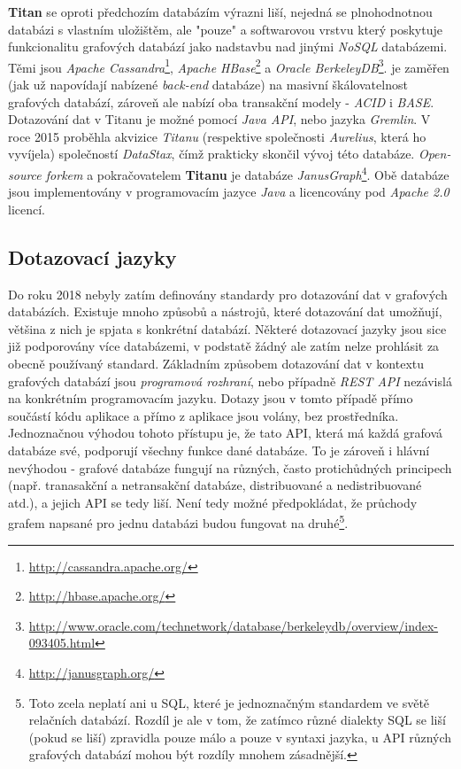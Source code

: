\textbf{Titan} se oproti předchozím databázím výrazni liší, nejedná se plnohodnotnou databázi s vlastním uložištěm, ale "pouze" a softwarovou vrstvu který poskytuje funkcionalitu grafových databází jako nadstavbu nad jinými \textit{NoSQL} databázemi. Těmi jsou \textit{Apache Cassandra}\footnote{\url{http://cassandra.apache.org/}}, \textit{Apache HBase}\footnote{\url{http://hbase.apache.org/}} a \textit{Oracle BerkeleyDB}\footnote{\url{http://www.oracle.com/technetwork/database/berkeleydb/overview/index-093405.html}}.  je zaměřen (jak už napovídají nabízené \textit{back-end} databáze) na masivní škálovatelnost grafových databází, zároveň ale nabízí oba transakční modely - \textit{ACID} i \textit{BASE}. Dotazování dat v Titanu je možné pomocí \textit{Java API}, nebo jazyka \textit{Gremlin}. V roce 2015 proběhla akvizice \textit{Titanu} (respektive společnosti \textit{Aurelius}, která ho vyvíjela) společností \textit{DataStax}, čímž prakticky skončil vývoj této databáze. \textit{Open-source forkem} a pokračovatelem\cite{Datami17} \textbf{Titanu} je databáze \textit{JanusGraph}\footnote{\url{http://janusgraph.org/}}. Obě databáze jsou implementovány v programovacím jazyce \textit{Java} a licencovány pod \textit{Apache 2.0} licencí. 


\subsection{Dotazovací jazyky}
\label{sec:gdb-jazyky}

Do roku 2018 nebyly zatím definovány standardy pro dotazování dat v grafových databázích. Existuje mnoho způsobů a nástrojů, které dotazování dat umožňují, většina z nich je spjata s konkrétní databází. Některé dotazovací jazyky jsou sice již podporovány více databázemi, v podstatě žádný ale zatím nelze prohlásit za obecně používaný standard. Základním způsobem dotazování dat v kontextu grafových databází jsou \textit{programová rozhraní}, nebo případně \textit{REST API} nezávislá na konkrétním programovacím jazyku. Dotazy jsou v tomto případě přímo součástí kódu aplikace a přímo z aplikace jsou volány, bez prostředníka. Jednoznačnou výhodou tohoto přístupu je, že tato API, která má každá grafová databáze své, podporují všechny funkce dané databáze. To je zároveň i hlávní nevýhodou - grafové databáze fungují na různých, často protichůdných principech (např. tranasakční a netransakční databáze, distribuované a nedistribuované atd.), a jejich API se tedy liší. Není tedy možné předpokládat, že průchody grafem napsané pro jednu databázi budou fungovat na druhé\footnote{Toto zcela neplatí ani u SQL, které je jednoznačným standardem ve světě relačních databází. Rozdíl je ale v tom, že zatímco různé dialekty SQL se liší (pokud se liší) zpravidla pouze málo a pouze v syntaxi jazyka, u API různých grafových databází mohou být rozdíly mnohem zásadnější.}.   

